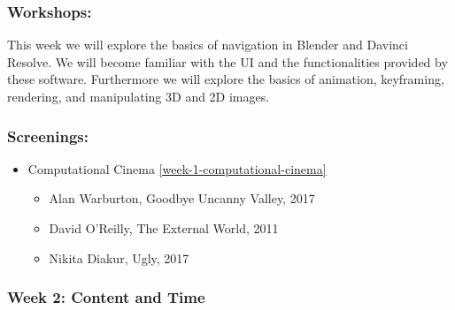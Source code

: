 \documentclass[10pt,letter,english]{article}
\begin{document}
\subsubsection*{Workshops:}
This week we will explore the basics of navigation in Blender and Davinci Resolve. We will become familiar with the UI and the functionalities provided by these software. Furthermore we will explore the basics of animation, keyframing, rendering, and manipulating 3D and 2D images.

\subsubsection*{Screenings:}

\begin{itemize}
      \item Computational Cinema \ref{week-1-computational-cinema}
            \begin{itemize}
                  \item
                        Alan Warburton, Goodbye Uncanny Valley, 2017
                  \item
                        David O'Reilly, The External World, 2011
                  \item
                        Nikita Diakur, Ugly, 2017
            \end{itemize}
\end{itemize}

\clearpage
\hypertarget{week-2-content-and-time}{%
      \subsubsection{Week 2: Content and Time}\label{week-2-content-and-time}}
\end{document}
